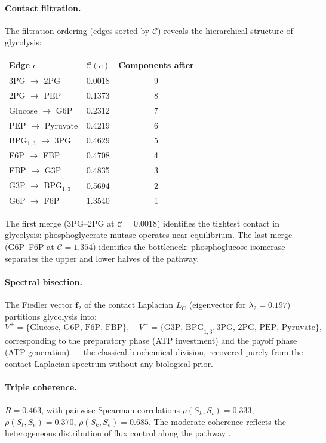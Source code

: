\documentclass[11pt,twocolumn]{article}
\theoremstyle{plain}
\theoremstyle{definition}
\newcommand{\CC}{\mathcal{C}}
\newcommand{\Sk}{S_k}
\newcommand{\St}{S_t}
\newcommand{\Se}{S_e}
\begin{document}
\paragraph{Contact filtration.}
The filtration ordering (edges sorted by $\CC$) reveals the hierarchical
structure of glycolysis:
\begin{center}
\begin{tabular}{lcc}
\toprule
Edge $e$ & $\CC(e)$ & Components after \\
\midrule
3PG $\to$ 2PG       & 0.0018 & 9 \\
2PG $\to$ PEP       & 0.1373 & 8 \\
Glucose $\to$ G6P   & 0.2312 & 7 \\
PEP $\to$ Pyruvate  & 0.4219 & 6 \\
BPG$_{1,3}$ $\to$ 3PG & 0.4629 & 5 \\
F6P $\to$ FBP       & 0.4708 & 4 \\
FBP $\to$ G3P       & 0.4835 & 3 \\
G3P $\to$ BPG$_{1,3}$ & 0.5694 & 2 \\
G6P $\to$ F6P       & 1.3540 & 1 \\
\bottomrule
\end{tabular}
\end{center}
The first merge (3PG--2PG at $\CC = 0.0018$) identifies the tightest contact
in glycolysis: phosphoglycerate mutase operates near equilibrium. The last
merge (G6P--F6P at $\CC = 1.354$) identifies the bottleneck: phosphoglucose
isomerase separates the upper and lower halves of the pathway.

\paragraph{Spectral bisection.}
The Fiedler vector $\mathbf{f}_2$ of the contact Laplacian $L_C$ (eigenvector
for $\lambda_2 = 0.197$) partitions glycolysis into:
\[
  V^+ = \{\text{Glucose, G6P, F6P, FBP}\}, \quad
  V^- = \{\text{G3P, BPG}_{1,3}, \text{3PG, 2PG, PEP, Pyruvate}\},
\]
corresponding to the preparatory phase (ATP investment) and the payoff phase
(ATP generation) --- the classical biochemical division, recovered purely from
the contact Laplacian spectrum without any biological prior.

\paragraph{Triple coherence.}
$R = 0.463$, with pairwise Spearman correlations $\rho(\Sk, \St) = 0.333$,
$\rho(\St, \Se) = 0.370$, $\rho(\Sk, \Se) = 0.685$. The moderate coherence
reflects the heterogeneous distribution of flux control along the pathway
\cite{kacser1973control, fell1992metabolic}.
\end{document}
